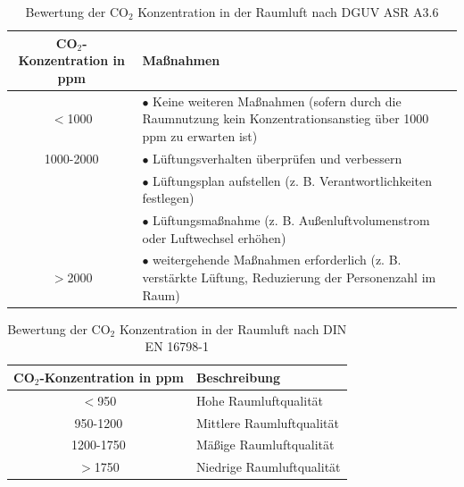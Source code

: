\documentclass[a4paper,
    11pt,
    headings=small,
    ngerman,
    listof=totoc,
    numbers=noenddot]{scrreprt}[2021/11/13]
\begin{document}
\newpage

\listoffigures
\listoftables
\lstlistoflistings
\printglossaries
\printbibliography

\newpage

\appendix
{}

\tableofcontents
\listoffigures
\listoftables
\lstlistoflistings


\begin{table}[htbp]
  \centering
  \renewcommand{\arraystretch}{1.25}
  \caption{Bewertung der CO$_2$ Konzentration in der Raumluft nach \ac{DGUV} \ac{ASR} A3.6 \autocite{ASR}}
  \begin{tabular}{c|p{}}
    CO$_2$-Konzentration in \ac{ppm} &  Maßnahmen                               \\
    \hline
    $<$1000 &  $\bullet$ Keine weiteren Maßnahmen (sofern durch die Raumnutzung kein Konzentrationsanstieg über 1000 ppm zu erwarten ist) \\
    \hline
    1000-2000 & $\bullet$ Lüftungsverhalten überprüfen und verbessern \\
              & $\bullet$ Lüftungsplan aufstellen (z. B. Verantwortlichkeiten festlegen) \\
              & $\bullet$ Lüftungsmaßnahme (z. B. Außenluftvolumenstrom oder Luftwechsel erhöhen) \\
    \hline
    $>$2000 &  $\bullet$ weitergehende Maßnahmen erforderlich (z. B. verstärkte Lüftung, Reduzierung der Personenzahl im Raum) \\
  \end{tabular}
  \label{appendix:tab:dguv_table_co2}
\end{table}

\begin{table}[htbp]
  \centering
  \renewcommand{\arraystretch}{1.25}
  \caption{Bewertung der CO$_2$ Konzentration in der Raumluft nach DIN EN 16798-1 \autocite{din_en_16798}}
  \begin{tabular}{c|p{}}
    CO$_2$-Konzentration in \ac{ppm} & Beschreibung   \\
    \hline
    $<$950 & Hohe Raumluftqualität \\
    950-1200 & Mittlere Raumluftqualität \\
    1200-1750 & Mäßige Raumluftqualität \\
    $>$1750 & Niedrige Raumluftqualität\\
  \end{tabular}
  \label{appendix:tab:din_table_co2}
\end{table}
\end{document}
